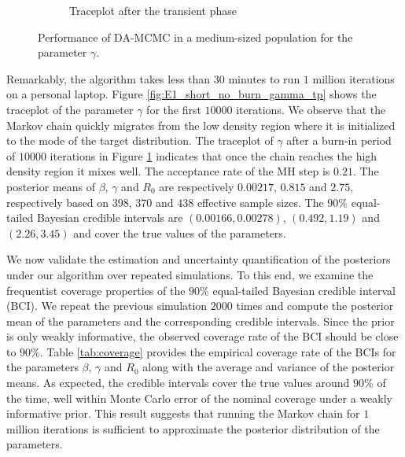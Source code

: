 \documentclass[12pt]{article}
\begin{document}
\begin{figure}
\begin{center}
\begin{subfigure}[b]{0.32\textwidth}
			\caption{Traceplot after the transient phase}
			\label{fig:E1_burn_gamma_tp}
		\end{subfigure}
	\end{center}
	\caption{Performance of DA-MCMC in a medium-sized population for the parameter $\gamma$.
		\label{fig:E1}}
\end{figure}

Remarkably, the algorithm takes less than $30$ minutes to run $1$ million iterations on a personal laptop. 
Figure \ref{fig:E1_short_no_burn_gamma_tp} shows the traceplot of the parameter $\gamma$ for the first $10000$ iterations. We observe that the Markov chain quickly migrates from the low density region where it is initialized to the mode of the target distribution. The traceplot of $\gamma$ after a burn-in period of $10000$ iterations in Figure \ref{fig:E1_burn_gamma_tp} indicates that once the chain reaches the high density region it mixes well. The acceptance rate of the MH step is $0.21$.
The posterior means of $\beta$, $\gamma$ and $R_0$ are respectively $0.00217$, $0.815$ and $2.75$, respectively based on $398$, $370$ and $438$ effective sample sizes. The $90\%$ equal-tailed Bayesian credible intervals are $(0.00166, 0.00278)$, $(0.492, 1.19)$ and $(2.26, 3.45)$ and cover the true values of the parameters. 

We now validate the estimation and uncertainty quantification of the posteriors under our algorithm over repeated simulations. To this end, we examine the frequentist coverage properties of the $90\%$ equal-tailed Bayesian credible interval (BCI). We repeat the previous simulation $2000$ times and compute the posterior mean of the parameters and the corresponding credible intervals. Since the prior is only weakly informative, the observed coverage rate of the BCI should be close to $90\%$.
Table \ref{tab:coverage} provides the empirical coverage rate of the BCIs for the parameters $\beta$, $\gamma$ and $R_0$ along with the average and variance of the posterior means. As expected, the credible intervals cover the true values around $90\%$ of the time, well within Monte Carlo error of the nominal coverage under a weakly informative prior. This result suggests that running the Markov chain for $1$ million iterations is sufficient to approximate the posterior distribution of the parameters.
\end{document}
